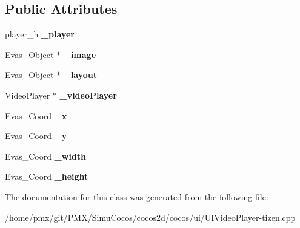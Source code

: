 \subsection*{Public Attributes}
\begin{DoxyCompactItemize}
\item 
\mbox{\label{class__VideoPlayerTizen_a9a555ee3ea8c6fbdeddd0febeb331bcc}} 
player\+\_\+h {\bfseries \+\_\+player}
\item 
\mbox{\label{class__VideoPlayerTizen_aa949e1c15618001d4b7aee162f6df419}} 
Evas\+\_\+\+Object $\ast$ {\bfseries \+\_\+image}
\item 
\mbox{\label{class__VideoPlayerTizen_a67b731df8b5e7ed1eb0c8db12e8d7330}} 
Evas\+\_\+\+Object $\ast$ {\bfseries \+\_\+layout}
\item 
\mbox{\label{class__VideoPlayerTizen_a4eb9df25b588cb07c7b711ac2c9e32d1}} 
Video\+Player $\ast$ {\bfseries \+\_\+video\+Player}
\item 
\mbox{\label{class__VideoPlayerTizen_ab918ca488859ce1e9d90e284030458f6}} 
Evas\+\_\+\+Coord {\bfseries \+\_\+x}
\item 
\mbox{\label{class__VideoPlayerTizen_ac774e79ef47c6efee5bd133f23437c58}} 
Evas\+\_\+\+Coord {\bfseries \+\_\+y}
\item 
\mbox{\label{class__VideoPlayerTizen_af696ae6a0e0168bf715a93b4d4e1d7ac}} 
Evas\+\_\+\+Coord {\bfseries \+\_\+width}
\item 
\mbox{\label{class__VideoPlayerTizen_a741f5b57ce37bcf04b3d60b79d437750}} 
Evas\+\_\+\+Coord {\bfseries \+\_\+height}
\end{DoxyCompactItemize}


The documentation for this class was generated from the following file\+:\begin{DoxyCompactItemize}
\item 
/home/pmx/git/\+P\+M\+X/\+Simu\+Cocos/cocos2d/cocos/ui/U\+I\+Video\+Player-\/tizen.\+cpp\end{DoxyCompactItemize}
